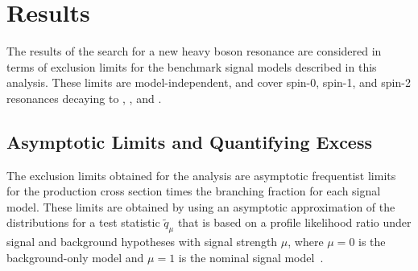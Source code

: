 
\section{Results}
\label{sec:results}

The results of the search for a new heavy boson resonance are considered in terms of exclusion limits for the benchmark signal models described in this analysis.
These limits are model-independent, and cover spin-0, spin-1, and spin-2 resonances decaying to \WW, \WZ, and \WH.

\subsection{Asymptotic Limits and Quantifying Excess}

The exclusion limits obtained for the analysis are asymptotic frequentist limits for the production cross section times the branching fraction for each signal model.
These limits are obtained by using an asymptotic approximation of the distributions for a test statistic $\tilde{q}_\mu$ that is based on a profile likelihood ratio under signal and background hypotheses with signal strength $\mu$, where $\mu=0$ is the background-only model and $\mu=1$ is the nominal signal model~\cite{Cowan_2011,CMS-NOTE-2011-005}.

